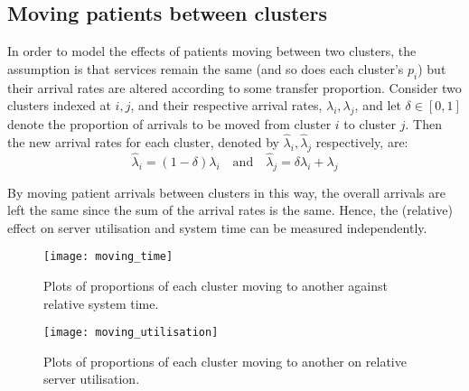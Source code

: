 \subsection{Moving patients between clusters}\label{subsec:moving}

In order to model the effects of patients moving between two clusters, the
assumption is that services remain the same (and so does each cluster's \(p_i\))
but their arrival rates are altered according to some transfer proportion.
Consider two clusters indexed at \(i, j\), and their respective arrival rates,
\(\lambda_i, \lambda_j\), and let \(\delta \in [0, 1]\) denote the proportion of
arrivals to be moved from cluster \(i\) to cluster \(j\). Then the new arrival
rates for each cluster, denoted by \(\hat\lambda_i, \hat\lambda_j\)
respectively, are:
\begin{equation}\label{eq:moving}
    \hat\lambda_i = \left(1 - \delta\right) \lambda_i
    \quad \text{and} \quad
    \hat\lambda_j = \delta\lambda_i + \lambda_j
\end{equation}

By moving patient arrivals between clusters in this way, the overall arrivals
are left the same since the sum of the arrival rates is the same. Hence, the
(relative) effect on server utilisation and system time can be measured
independently.

\begin{figure}
    \centering
    \texttt{[image: moving\_time]}
    \caption{%
        Plots of proportions of each cluster moving to another against relative
        system time.
    }\label{fig:moving_time}
\end{figure}

\begin{figure}
    \centering
    \texttt{[image: moving\_utilisation]}
    \caption{%
        Plots of proportions of each cluster moving to another on relative
        server utilisation.
    }\label{fig:moving_utilisation}
\end{figure}
